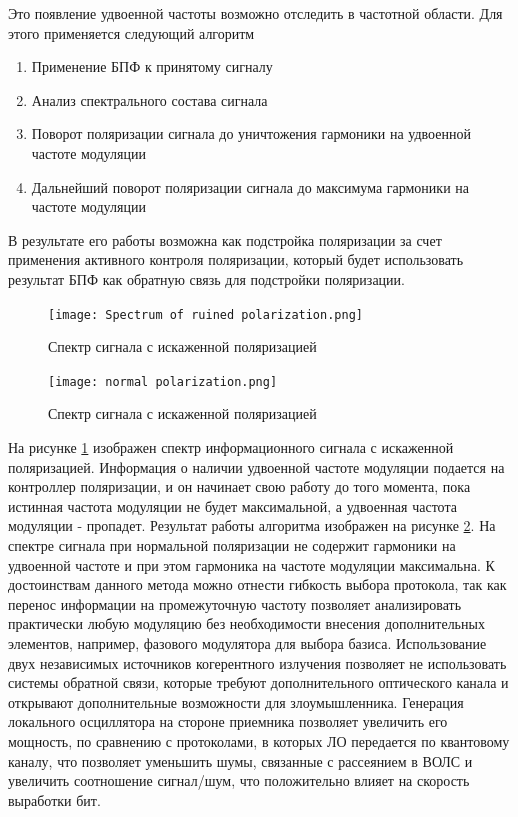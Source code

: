Это появление удвоенной частоты возможно отследить в частотной области. Для этого применяется следующий алгоритм 
\begin{enumerate}
    \item Применение БПФ к принятому сигналу
    \item Анализ спектрального состава сигнала
    \item Поворот поляризации сигнала до уничтожения гармоники на удвоенной частоте модуляции
    \item Дальнейший поворот поляризации сигнала до максимума гармоники на частоте модуляции
\end{enumerate}
В результате его работы возможна как подстройка поляризации за счет применения активного контроля поляризации, который будет использовать результат БПФ как обратную связь для подстройки поляризации. 
\begin{figure}
    \centering
    \texttt{[image: Spectrum of ruined polarization.png]}
    \caption{Спектр сигнала с искаженной поляризацией}
    \label{fig:ref ruin pol}
\end{figure}
\begin{figure}
    \centering
    \texttt{[image: normal polarization.png]}
    \caption{Спектр сигнала с искаженной поляризацией}
    \label{fig:ref norm pol}
\end{figure}
На рисунке \ref{fig:ref ruin pol} изображен спектр информационного сигнала с искаженной поляризацией. Информация о наличии удвоенной частоте модуляции подается на контроллер поляризации, и он начинает свою работу до того момента, пока истинная частота модуляции не будет максимальной, а удвоенная частота модуляции - пропадет. Результат работы алгоритма изображен на рисунке \ref{fig:ref norm pol}. На спектре сигнала при нормальной поляризации не содержит гармоники на удвоенной частоте и при этом гармоника на частоте модуляции максимальна.
\newline К достоинствам данного метода можно отнести гибкость выбора протокола, так как перенос информации на промежуточную частоту позволяет анализировать практически любую модуляцию без необходимости внесения дополнительных элементов, например, фазового модулятора для выбора базиса. Использование двух независимых источников когерентного излучения позволяет не использовать системы обратной связи, которые требуют дополнительного оптического канала и открывают дополнительные возможности для злоумышленника. Генерация локального осциллятора на стороне приемника позволяет увеличить его мощность, по сравнению с протоколами, в которых ЛО передается по квантовому каналу, что позволяет уменьшить шумы, связанные с рассеянием в ВОЛС и увеличить соотношение сигнал/шум, что положительно влияет на скорость выработки бит. 
